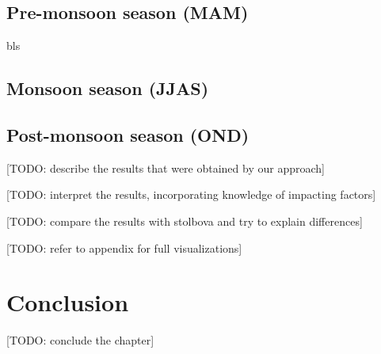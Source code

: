 \subsection{Pre-monsoon season (MAM)}
bls

\subsection{Monsoon season (JJAS)}

\subsection{Post-monsoon season (OND)}




[TODO: describe the results that were obtained by our approach]

[TODO: interpret the results, incorporating knowledge of impacting factors]

[TODO: compare the results with stolbova and try to explain differences]

[TODO: refer to appendix for full visualizations]

\section{Conclusion}
\label{st:event_sync_conclusion}
[TODO: conclude the chapter]
